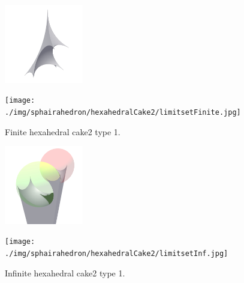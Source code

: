 \documentclass[suppldata, dvipdfmx]{interact}
\theoremstyle{plain}%
\theoremstyle{definition}
\theoremstyle{remark}
\theoremstyle{problemstyle}
\begin{document}
\begin{figure}[H]
 \begin{minipage}{0.5\textwidth}
  \begin{minipage}[t]{0.24\textwidth}
   \centering
   \includegraphics[width=1.35in, height=1.35in,
   keepaspectratio]{./img/sphairahedron/hexahedralCake2/sphairahedronFinite.jpg}
   \label{fig:cake2FiniteSphairahedron}
  \end{minipage}
  \hspace*{\fill}
  \begin{minipage}[t]{0.24\textwidth}
   \centering
   \texttt{[image: ./img/sphairahedron/hexahedralCake2/limitsetFinite.jpg]}
   \label{fig:cake2FiniteLimitset}
  \end{minipage}
  \hspace*{\fill}
  \caption{Finite hexahedral cake2 type 1.}
  \label{fig:cakeFinite}
 \end{minipage}
 \hspace*{\fill}
 \begin{minipage}{0.5\textwidth}
  \begin{minipage}[t]{0.24\textwidth}
   \centering
   \includegraphics[width=1.35in, height=1.35in,
   keepaspectratio]{./img/sphairahedron/hexahedralCake2/sphairahedronInf.jpg}
   \label{fig:cake2InfSphairahedron}
  \end{minipage}
  \hspace*{\fill}
  \begin{minipage}[t]{0.24\textwidth}
   \centering
   \texttt{[image: ./img/sphairahedron/hexahedralCake2/limitsetInf.jpg]} 
   \label{fig:cake2InfLimitset}
  \end{minipage}
  \hspace*{\fill}
  \caption{Infinite hexahedral cake2 type 1.}
  \label{fig:cakeInf}
 \end{minipage}
\end{figure}
\end{document}
